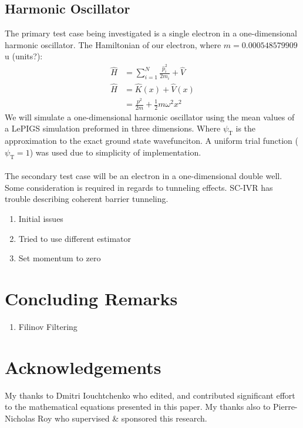 \documentclass[12pt,letterpaper,oneside,final,titlepage]{article}               %
\numberwithin{equation}{section} %
\newcommand{\psiT}{\psi_{\textrm{T}}}
\begin{document}
\subsection*{Harmonic Oscillator}
The primary test case being investigated is a single electron in a one-dimensional harmonic oscillator. 
The Hamiltonian of our electron, where $m = \num{0.000548579909}$u (units?): 
\begin{align}
    \hat{H} &= \sum_{i=1}^{N}\frac{\hat{p}_{i}^2}{2m_{i}} + \hat{V} \\
    \hat{H} &= \hat{K}(x) + \hat{V}(x) \\
            &= \frac{p^2}{2m} + \frac{1}{2} m \omega^{2} x^{2} 
\end{align}
We will simulate a one-dimensional harmonic oscillator using the mean values of a LePIGS simulation preformed in three dimensions. 
Where $\psiT$ is the approximation to the exact ground state wavefunciton. 
A uniform trial function ($\psiT = 1$) was used due to simplicity of implementation. \\ \\
The secondary test case will be an electron in a one-dimensional double well. 
Some consideration is required in regards to tunneling effects. SC-IVR has trouble describing coherent barrier tunneling.
\begin{enumerate}
    \item Initial issues
    \item Tried to use different estimator
    \item Set momentum to zero
\end{enumerate}

\section{Concluding Remarks}
\begin{enumerate}
    \item Filinov Filtering
\end{enumerate}

\newpage

\section{Acknowledgements}
My thanks to Dmitri Iouchtchenko who edited, and contributed significant effort to the mathematical equations presented in this paper. 
My thanks also to Pierre-Nicholas Roy who supervised \& sponsored this research.

\renewcommand*{\bibfont}{\scriptsize}
\printbibliography
\end{document}
